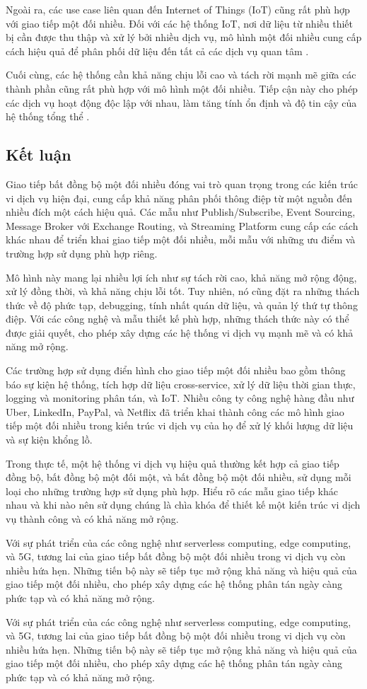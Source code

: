 Ngoài ra, các use case liên quan đến Internet of Things (IoT) cũng rất phù hợp với giao tiếp một đối nhiều. Đối với các hệ thống IoT, nơi dữ liệu từ nhiều thiết bị cần được thu thập và xử lý bởi nhiều dịch vụ, mô hình một đối nhiều cung cấp cách hiệu quả để phân phối dữ liệu đến tất cả các dịch vụ quan tâm \cite{indrasiri2020}.

Cuối cùng, các hệ thống cần khả năng chịu lỗi cao và tách rời mạnh mẽ giữa các thành phần cũng rất phù hợp với mô hình một đối nhiều. Tiếp cận này cho phép các dịch vụ hoạt động độc lập với nhau, làm tăng tính ổn định và độ tin cậy của hệ thống tổng thể \cite{fowler2002}.

\subsection{Kết luận}
Giao tiếp bất đồng bộ một đối nhiều đóng vai trò quan trọng trong các kiến trúc vi dịch vụ hiện đại, cung cấp khả năng phân phối thông điệp từ một nguồn đến nhiều đích một cách hiệu quả. Các mẫu như Publish/Subscribe, Event Sourcing, Message Broker với Exchange Routing, và Streaming Platform cung cấp các cách khác nhau để triển khai giao tiếp một đối nhiều, mỗi mẫu với những ưu điểm và trường hợp sử dụng phù hợp riêng.

Mô hình này mang lại nhiều lợi ích như sự tách rời cao, khả năng mở rộng động, xử lý đồng thời, và khả năng chịu lỗi tốt. Tuy nhiên, nó cũng đặt ra những thách thức về độ phức tạp, debugging, tính nhất quán dữ liệu, và quản lý thứ tự thông điệp. Với các công nghệ và mẫu thiết kế phù hợp, những thách thức này có thể được giải quyết, cho phép xây dựng các hệ thống vi dịch vụ mạnh mẽ và có khả năng mở rộng.

Các trường hợp sử dụng điển hình cho giao tiếp một đối nhiều bao gồm thông báo sự kiện hệ thống, tích hợp dữ liệu cross-service, xử lý dữ liệu thời gian thực, logging và monitoring phân tán, và IoT. Nhiều công ty công nghệ hàng đầu như Uber, LinkedIn, PayPal, và Netflix đã triển khai thành công các mô hình giao tiếp một đối nhiều trong kiến trúc vi dịch vụ của họ để xử lý khối lượng dữ liệu và sự kiện khổng lồ.

Trong thực tế, một hệ thống vi dịch vụ hiệu quả thường kết hợp cả giao tiếp đồng bộ, bất đồng bộ một đối một, và bất đồng bộ một đối nhiều, sử dụng mỗi loại cho những trường hợp sử dụng phù hợp. Hiểu rõ các mẫu giao tiếp khác nhau và khi nào nên sử dụng chúng là chìa khóa để thiết kế một kiến trúc vi dịch vụ thành công và có khả năng mở rộng.

Với sự phát triển của các công nghệ như serverless computing, edge computing, và 5G, tương lai của giao tiếp bất đồng bộ một đối nhiều trong vi dịch vụ còn nhiều hứa hẹn. Những tiến bộ này sẽ tiếp tục mở rộng khả năng và hiệu quả của giao tiếp một đối nhiều, cho phép xây dựng các hệ thống phân tán ngày càng phức tạp và có khả năng mở rộng.

Với sự phát triển của các công nghệ như serverless computing, edge computing, và 5G, tương lai của giao tiếp bất đồng bộ một đối nhiều trong vi dịch vụ còn nhiều hứa hẹn. Những tiến bộ này sẽ tiếp tục mở rộng khả năng và hiệu quả của giao tiếp một đối nhiều, cho phép xây dựng các hệ thống phân tán ngày càng phức tạp và có khả năng mở rộng.